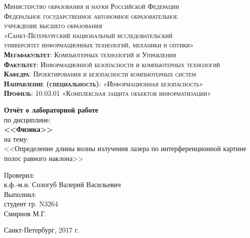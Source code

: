\begin{titlepage}
	\begin{center}
		\textsc{
			\fontsize{12pt}{14pt}\selectfont
			Министерство образования и науки Российской Федерации\\
			Федеральное государственное автономное образовательное\\
			учреждение высшего образования\\
			«Санкт-Петербургский национальный исследовательский\\
			университет информационных технологий, механики и оптики»\\
			\textbf{Мегафакультет}:  Компьютерных технологий и Управления\\
			\textbf{Факультет}: Информационной безопасности и компьютерных технологий\\
			\textbf{Кафедра}: Проектирования и безопасности компьютерных систем\\
			\textbf{Направление (специальность)}: «Информационная безопасность»\\
			\textbf{Профиль}: 10.03.01 «Комплексная защита объектов информатизации»}

		\vfill

		\textbf{Отчёт о лабораторной работе}\\
		по дисциплине:\\
		\textbf{<<Физика>>}\\
		на тему:\\
		<<Определение длины волны излучения лазера по интерференционной картине полос равного наклона>>\\
	\end{center}

	\hfill
	\begin{flushright}
		Проверил:\\[2mm] 
		к.ф.-м.н. Сологуб Валерий Васильевич\\[2mm] 

		Выполнил:\\
		студент гр.  N3264\\
		Смирнов М.Г.\\[2mm]

	\end{flushright}%
	\vfill
	\begin{center}
		Санкт-Петербург, 2017 г.
	\end{center}
\end{titlepage}

